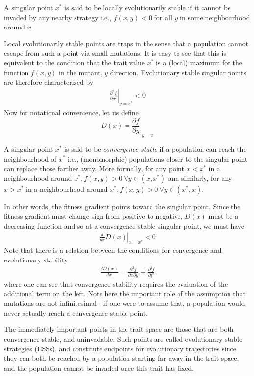 \begin{definition}
	A singular point $x^*$ is said to be locally evolutionarily stable if it cannot be invaded by any nearby strategy i.e., $f(x,y)<0$ for all $y$ in some neighbourhood around $x$. 
\end{definition}
Local evolutionarily stable points are traps in the sense that a population cannot escape from such a point via small mutations. 
It is easy to see that this is equivalent to the condition that the trait value $x^*$ is a (local) maximum for the function $f(x,y)$ in the mutant, $y$ direction. 
Evolutionary stable singular points are therefore characterized by 
\begin{align}
	\left. \frac{\partial^2 f}{\partial y^2} \right|_{y=x^*} < 0
\end{align}
Now for notational convenience, let us define 
\[
D(x) = \left. \frac{\partial f}{\partial y} \right|_{y=x}
\]
\begin{definition}
	A singular point $x^*$ is said to be \textit{convergence stable} if a population can reach the neighbourhood of $x^*$ i.e., (monomorphic) populations closer to the singular point can replace those farther away. 
	More formally, for any point $x<x^*$ in a neighbourhood around $x^*, f(x,y)>0 \ \forall y \in (x,x^*)$ and similarly, for any $x>x^*$ in a neighbourhood around $x^*, f(x,y)>0 \ \forall y \in (x^*,x)$. 
\end{definition}
In other words, the fitness gradient points toward the singular point. Since the fitness gradient must change sign from positive to negative, $D(x)$ must be a decreasing function and so at a convergence stable singular point, we must have 
\begin{align}
	\left. \frac{d}{dx} D(x) \right|_{x=x^*} < 0 
\end{align} 
Note that there is a relation between the conditions for convergence and evolutionary stability
\begin{align}
	\frac{dD(x)}{dx} = \frac{\partial^2 f}{\partial x \partial y} + \frac{\partial^2 f}{\partial y^2}
	\label{eqn: selection-gradient-1D}
\end{align}
where one can see that convergence stability requires the evaluation of the additional term on the left. 
Note here the important role of the assumption that mutations are not infinitesimal - if one were to assume that, a population would never actually reach a convergence stable point.

The immediately important points in the trait space are those that are both convergence stable, and uninvadable.
Such points are called evolutionary stable strategies (ESSs), and constitute endpoints for evolutionary trajectories since they can both be reached by a population starting far away in the trait space, and the population cannot be invaded once this trait has fixed. 

